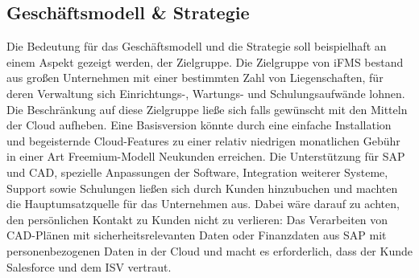 \subsection{Geschäftsmodell \& Strategie}
\begin{comment}
In Orientierung an Abbildung~\ref{fig:einfluss_des_preises_auf_business} soll 
in Tabelle~\ref{} zunächst iFMS in Preis und davon abhängigen Dimensionen 
analysiert werden. 


\begin{table}[bh]
\newcommand{\colBreite}{0.135\textwidth}
\newcommand{\theColor}{blue!25}
\centering
\begin{tabular}[width=0.95\textwidth]
{|p{\colBreite}|p{\colBreite}|p{\colBreite}|p{\colBreite}|p{
\colBreite} |p{\colBreite}|}
\hline
\textbf{Verkaufs\-preis} & \textbf{Kosten für Kun\-den\-aqui\-si\-tion} & 
\textbf{Vertrieb} & \textbf{Kun\-den\-be\-ziehungen} & \textbf{Vertretbare 
Nutzerschulungen} & \textbf{Ziel\-gruppen} \\
\hline
€€€€€ & Hoch & Extern & \cellcolor{\theColor}Persönlich\newline iFMS & 
\cellcolor{\theColor}Erheblich\newline iFMS & 
\cellcolor{\theColor}Unterneh\-men\newline iFMS \\
\hline
\cellcolor{\theColor}€€€\newline iFMS & \cellcolor{\theColor}Moderat\newline 
iFMS & \cellcolor{\theColor}Intern\newline iFMS & Telefonisch & Moderat & 
Abteilungen, 
KMU \\
\hline
€ & Niedrig & Keinen & Web & Minimal & KMU, Personen \\
\hline
\end{tabular}
\caption{Kosten für iFMS und iFMS@Salesforce aus Kundensicht und Folgerungen 
auf die Zielgruppe.}
\label{tab:analyse_preis}
\end{table}
\end{comment}
Die Bedeutung für das Geschäftsmodell und die Strategie soll beispielhaft an 
einem Aspekt gezeigt werden, der Zielgruppe. Die Zielgruppe von iFMS bestand 
aus großen Unternehmen mit einer bestimmten 
Zahl von Liegenschaften, für deren Verwaltung sich Einrichtungs-, Wartungs- und 
Schulungsaufwände lohnen. Die Beschränkung auf diese Zielgruppe ließe sich 
falls gewünscht mit den Mitteln der Cloud aufheben. Eine Basisversion könnte 
durch eine einfache Installation und begeisternde Cloud-Features zu einer 
relativ niedrigen monatlichen Gebühr in einer Art Freemium-Modell Neukunden 
erreichen. Die Unterstützung für SAP und CAD, spezielle Anpassungen der 
Software, Integration weiterer Systeme, Support sowie Schulungen ließen sich 
durch Kunden hinzubuchen und machten die Hauptumsatzquelle für das Unternehmen 
aus. Dabei wäre darauf zu achten, den persönlichen Kontakt zu Kunden nicht zu 
verlieren: Das Verarbeiten von CAD-Plänen mit sicherheitsrelevanten Daten oder 
Finanzdaten aus SAP mit personenbezogenen Daten in der Cloud und macht es 
erforderlich, dass der Kunde Salesforce und dem ISV vertraut.

